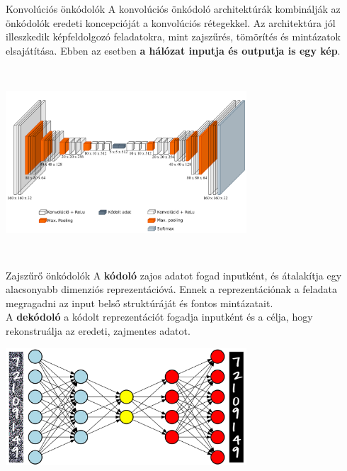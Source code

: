 \documentclass[english, aspectratio=169]{beamer}
\begin{document}
\begin{frame}{Konvolúciós önkódolók}
A konvolúciós önkódoló architektúrák kombinálják az önkódolók eredeti koncepcióját a konvolúciós rétegekkel. Az architektúra jól illeszkedik képfeldolgozó feladatokra, mint zajszűrés, tömörítés és mintázatok elsajátítása. Ebben az esetben \textbf{a hálózat inputja és outputja is egy kép}.
\begin{center}
\includegraphics[height=7cm, width=9cm, keepaspectratio]{images/dl_9.png}
\end{center}
\end{frame}

\begin{frame}{Zajszűrő önkódolók}
A \textbf{kódoló} zajos adatot fogad inputként, és átalakítja egy alacsonyabb dimenziós reprezentációvá. Ennek a reprezentációnak a feladata megragadni az input belső struktúráját és fontos mintázatait.\\
A \textbf{dekódoló} a kódolt reprezentációt fogadja inputként és a célja, hogy rekonstruálja az eredeti, zajmentes adatot.
\begin{center}
\includegraphics[width=9cm, keepaspectratio]{images/dl_10.png}
\end{center}
\end{frame}
\end{document}
